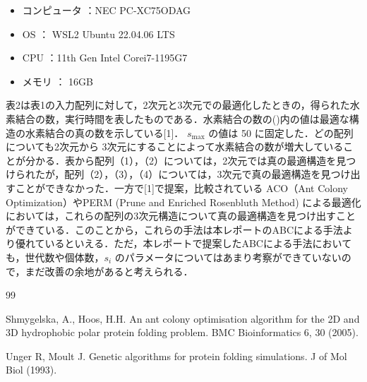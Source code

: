 \documentclass[a4paper, 10pt,  twocolumn]{ltjsarticle}
\begin{document}
\begin{itemize}
    \item コンピュータ ：NEC PC-XC75ODAG
    \item OS ： WSL2 Ubuntu 22.04.06 LTS
    \item CPU ：11th Gen Intel Corei7-1195G7 
    \item メモリ ： 16GB 
\end{itemize}
表2は表1の入力配列に対して，2次元と3次元での最適化したときの，得られた水素結合の数，実行時間を表したものである．水素結合の数の()内の値は最適な構造の水素結合の真の数を示している[1]． $s_{\mathrm{max}}$ の値は 50 に固定した．どの配列についても2次元から 3次元にすることによって水素結合の数が増大していることが分かる．表から配列（1），（2）については，2次元では真の最適構造を見つけられたが，配列（2），（3），（4）については，3次元で真の最適構造を見つけ出すことができなかった．一方で[1]で提案，比較されている ACO（Ant Colony Optimization）やPERM (Prune and Enriched Rosenbluth Method) による最適化においては，これらの配列の3次元構造について真の最適構造を見つけ出すことができている．このことから，これらの手法は本レポートのABCによる手法より優れているといえる．ただ，本レポートで提案したABCによる手法においても，世代数や個体数，$s_i$ のパラメータについてはあまり考察ができていないので，まだ改善の余地があると考えられる．

\begin{thebibliography}{99}
    \item
    Shmygelska, A., Hoos, H.H. An ant colony optimisation algorithm for the 2D and 3D hydrophobic polar protein folding problem. BMC Bioinformatics 6, 30 (2005).
    \item 
    Unger R, Moult J. Genetic algorithms for protein folding
    simulations. J of Mol Biol (1993).
\end{thebibliography}
\end{document}

